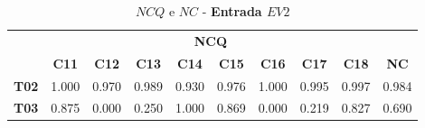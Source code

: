 \begin{table}[htbp]
	\centering
	\caption{$NCQ$ e $NC$ - \textbf{Entrada $EV2$}}
	\begin{tabular}{|c|cccccccc|c|}
		\hline
		\rowcolor[HTML]{D0CECE} 
		\cellcolor[HTML]{D0CECE}                                 & \multicolumn{8}{c|}{\cellcolor[HTML]{D0CECE}\textbf{NCQ}}                                                                                                                                                                                                                                                                                                                                                                                        & \cellcolor[HTML]{D0CECE}                              \\ \cline{2-9}
		\rowcolor[HTML]{D0CECE} 
		\multirow{-2}{*}{\cellcolor[HTML]{D0CECE}\textbf{Part.}} & \multicolumn{1}{c|}{\cellcolor[HTML]{D0CECE}\textbf{C11}} & \multicolumn{1}{c|}{\cellcolor[HTML]{D0CECE}\textbf{C12}} & \multicolumn{1}{c|}{\cellcolor[HTML]{D0CECE}\textbf{C13}} & \multicolumn{1}{c|}{\cellcolor[HTML]{D0CECE}\textbf{C14}} & \multicolumn{1}{c|}{\cellcolor[HTML]{D0CECE}\textbf{C15}} & \multicolumn{1}{c|}{\cellcolor[HTML]{D0CECE}\textbf{C16}} & \multicolumn{1}{c|}{\cellcolor[HTML]{D0CECE}\textbf{C17}} & \textbf{C18} & \multirow{-2}{*}{\cellcolor[HTML]{D0CECE}\textbf{NC}} \\ \hline
		\textbf{T02}                                             & \multicolumn{1}{c|}{1.000}                                & \multicolumn{1}{c|}{0.970}                                & \multicolumn{1}{c|}{0.989}                                & \multicolumn{1}{c|}{0.930}                                & \multicolumn{1}{c|}{0.976}                                & \multicolumn{1}{c|}{1.000}                                & \multicolumn{1}{c|}{0.995}                                & 0.997        & 0.984                                                 \\ \hline
		\rowcolor[HTML]{F2F2F2} 
		\textbf{T03}                                             & \multicolumn{1}{c|}{\cellcolor[HTML]{F2F2F2}0.875}        & \multicolumn{1}{c|}{\cellcolor[HTML]{F2F2F2}0.000}        & \multicolumn{1}{c|}{\cellcolor[HTML]{F2F2F2}0.250}        & \multicolumn{1}{c|}{\cellcolor[HTML]{F2F2F2}1.000}        & \multicolumn{1}{c|}{\cellcolor[HTML]{F2F2F2}0.869}        & \multicolumn{1}{c|}{\cellcolor[HTML]{F2F2F2}0.000}        & \multicolumn{1}{c|}{\cellcolor[HTML]{F2F2F2}0.219}        & 0.827        & 0.690                                                 \\ \hline

\end{tabular}
\end{table}
